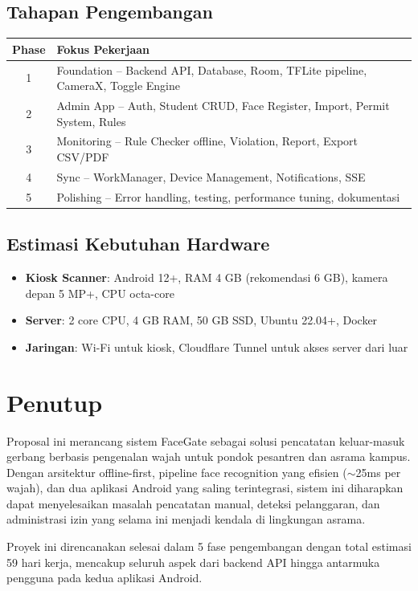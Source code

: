 \documentclass[12pt,a4paper]{article}
\newcommand{\appname}{FaceGate}
\begin{document}
\subsection{Tahapan Pengembangan}

\begin{table}[H]
  \centering
  \begin{tabularx}{\textwidth}{cX}
    \toprule
    \textbf{Phase} & \textbf{Fokus Pekerjaan} \\
    \midrule
    1 & Foundation -- Backend API, Database, Room, TFLite pipeline, CameraX, Toggle Engine \\
    2 & Admin App -- Auth, Student CRUD, Face Register, Import, Permit System, Rules \\
    3 & Monitoring -- Rule Checker offline, Violation, Report, Export CSV/PDF \\
    4 & Sync -- WorkManager, Device Management, Notifications, SSE \\
    5 & Polishing -- Error handling, testing, performance tuning, dokumentasi \\
    \bottomrule
  \end{tabularx}
\end{table}

\subsection{Estimasi Kebutuhan Hardware}

\begin{itemize}[nolistsep]
  \item \textbf{Kiosk Scanner}: Android 12+, RAM 4 GB (rekomendasi 6 GB), kamera depan 5 MP+, CPU octa-core
  \item \textbf{Server}: 2 core CPU, 4 GB RAM, 50 GB SSD, Ubuntu 22.04+, Docker
  \item \textbf{Jaringan}: Wi-Fi untuk kiosk, Cloudflare Tunnel untuk akses server dari luar
\end{itemize}

\section{Penutup}

Proposal ini merancang sistem \appname{} sebagai solusi pencatatan keluar-masuk gerbang berbasis pengenalan wajah untuk pondok pesantren dan asrama kampus. Dengan arsitektur offline-first, pipeline face recognition yang efisien ($\sim$25ms per wajah), dan dua aplikasi Android yang saling terintegrasi, sistem ini diharapkan dapat menyelesaikan masalah pencatatan manual, deteksi pelanggaran, dan administrasi izin yang selama ini menjadi kendala di lingkungan asrama.

Proyek ini direncanakan selesai dalam 5 fase pengembangan dengan total estimasi 59 hari kerja, mencakup seluruh aspek dari backend API hingga antarmuka pengguna pada kedua aplikasi Android.
\end{document}
